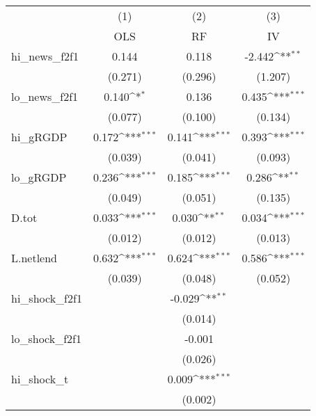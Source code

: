 {
\def\sym#1{\ifmmode^{#1}\else\(^{#1}\)\fi}
\begin{tabular}{l*{3}{c}}
\toprule
            &\multicolumn{1}{c}{(1)}&\multicolumn{1}{c}{(2)}&\multicolumn{1}{c}{(3)}\\
            &\multicolumn{1}{c}{OLS}&\multicolumn{1}{c}{RF}&\multicolumn{1}{c}{IV}\\
\midrule
hi\_news\_f2f1&       0.144         &       0.118         &      -2.442\sym{**} \\
            &     (0.271)         &     (0.296)         &     (1.207)         \\
\addlinespace
lo\_news\_f2f1&       0.140\sym{*}  &       0.136         &       0.435\sym{***}\\
            &     (0.077)         &     (0.100)         &     (0.134)         \\
\addlinespace
hi\_gRGDP    &       0.172\sym{***}&       0.141\sym{***}&       0.393\sym{***}\\
            &     (0.039)         &     (0.041)         &     (0.093)         \\
\addlinespace
lo\_gRGDP    &       0.236\sym{***}&       0.185\sym{***}&       0.286\sym{**} \\
            &     (0.049)         &     (0.051)         &     (0.135)         \\
\addlinespace
D.tot       &       0.033\sym{***}&       0.030\sym{**} &       0.034\sym{***}\\
            &     (0.012)         &     (0.012)         &     (0.013)         \\
\addlinespace
L.netlend   &       0.632\sym{***}&       0.624\sym{***}&       0.586\sym{***}\\
            &     (0.039)         &     (0.048)         &     (0.052)         \\
\addlinespace
hi\_shock\_f2f1&                     &      -0.029\sym{**} &                     \\
            &                     &     (0.014)         &                     \\
\addlinespace
lo\_shock\_f2f1&                     &      -0.001         &                     \\
            &                     &     (0.026)         &                     \\
\addlinespace
hi\_shock\_t  &                     &       0.009\sym{***}&                     \\
            &                     &     (0.002)         &                     \\

\end{tabular}}
